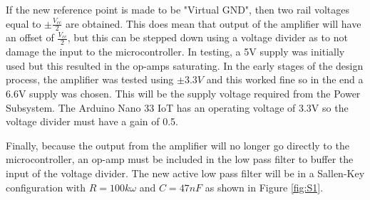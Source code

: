 \documentclass[class=report,11pt,crop=false]{standalone}
\begin{document}
	If the new reference point is made to be "Virtual GND", then two rail voltages equal to $\pm \frac{V_{cc}}{2}$ are obtained. This does mean that output of the amplifier will have an offset of $\frac{V_{cc}}{2}$, but this can be stepped down using a voltage divider as to not damage the input to the microcontroller. In testing, a 5V supply was initially used but this resulted in the op-amps saturating. In the early stages of the design process, the amplifier was tested using $\pm3.3V$ and this worked fine so in the end a 6.6V supply was chosen. This will be the supply voltage required from the Power Subsystem. The Arduino Nano 33 IoT has an operating voltage of 3.3V so the voltage divider must have a gain of 0.5.
	
	Finally, because the output from the amplifier will no longer go directly to the microcontroller, an op-amp must be included in the low pass filter to buffer the input of the voltage divider. The new active low pass filter will be in a Sallen-Key configuration with $R = 100k\omega$ and $C = 47nF$ as shown in Figure \ref{fig:S1}.
	
\end{document}
